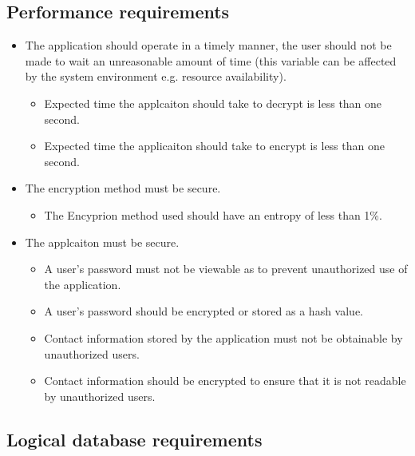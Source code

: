 \subsection{Performance requirements}
\begin{itemize}
\item The application should operate in a timely manner, the user should not be made to wait an unreasonable amount of time (this variable can be affected by the system environment e.g. resource availability).
\begin{itemize}
\item Expected time the applcaiton should take to decrypt is less than one second.
\item Expected time the applicaiton should take to encrypt is less than one second.
\end{itemize}
\item The encryption method must be secure.
\begin{itemize}
\item The Encyprion method used should have an entropy of less than 1\%.
\end{itemize}
\item The applcaiton must be secure.
\begin{itemize}
\item A user’s password must not be viewable as to prevent unauthorized use of the application.
\item A user’s password should be encrypted or stored as a hash value.
\item Contact information stored by the application must not be obtainable by unauthorized users.
\item Contact information should be encrypted to ensure that it is not readable by unauthorized users.
\end{itemize}
\end{itemize}

\subsection{Logical database requirements}

